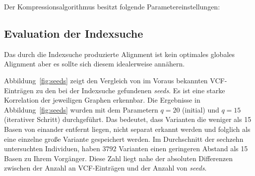 \documentclass[12pt]{article}
\begin{document}
Der Kompressionsalgorithmus besitzt folgende Parametereinstellungen:
\begin{table}[h!]
\caption{\label{tab:parameter}\emph{Parameter des SeqAn Tools für referentielle Kompression}.}
\end{table}

\subsection{Evaluation der Indexsuche}
Das durch die Indexsuche produzierte Alignment ist kein optimales globales Alignment aber es sollte sich diesem idealerweise annähern. 

Abbildung~\ref{fig:seeds} zeigt den Vergleich von im Voraus bekannten VCF-Einträgen zu den bei der Indexsuche gefundenen \textit{seeds}. Es ist eine starke Korrelation der jeweiligen Graphen erkennbar. Die Ergebnisse in Abbildung~\ref{fig:seeds} wurden mit dem Parametern $q=20$ (initial) und $q=15$ (iterativer Schritt) durchgeführt. Das bedeutet, dass Varianten die weniger als 15 Basen von einander entfernt liegen, nicht separat erkannt werden und folglich als eine einzelne große Variante gespeichert werden. Im Durchschnitt der sechzehn untersuchten Individuen, haben $3792$ Varianten einen geringeren Abstand als 15 Basen zu Ihrem Vorgänger. Diese Zahl liegt nahe der absoluten Differenzen zwischen der Anzahl an VCF-Einträgen und der Anzahl von \textit{seeds}.
\end{document}
